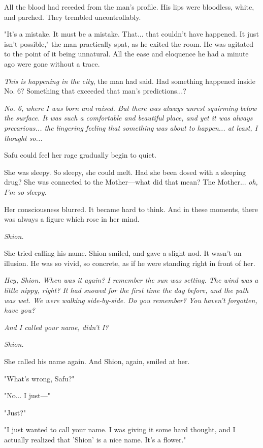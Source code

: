 All the blood had receded from the man's profile. His lips were
bloodless, white, and parched. They trembled uncontrollably.

"It's a mistake. It must be a mistake. That... that couldn't have
happened. It just isn't possible," the man practically spat, as he
exited the room. He was agitated to the point of it being unnatural. All
the ease and eloquence he had a minute ago were gone without a trace.

\emph{This is happening in the city}, the man had said. Had something happened
inside No. 6? Something that exceeded that man's predictions...?

\emph{No. 6, where I was born and raised. But there was always unrest
squirming below the surface. It was such a comfortable and beautiful
place, and yet it was always precarious... the lingering feeling that
something was about to happen... at least, I thought so...}

Safu could feel her rage gradually begin to quiet.

She was sleepy. So sleepy, she could melt. Had she been dosed with a
sleeping drug? She was connected to the Mother---what did that mean? The
Mother... \emph{oh, I'm so sleepy.}

Her consciousness blurred. It became hard to think. And in these
moments, there was always a figure which rose in her mind.

\emph{Shion.}

She tried calling his name. Shion smiled, and gave a slight nod. It
wasn't an illusion. He was so vivid, so concrete, as if he were standing
right in front of her.

\emph{Hey, Shion. When was it again? I remember the sun was setting. The wind
was a little nippy, right? It had snowed for the first time the day
before, and the path was wet. We were walking side-by-side. Do you
remember? You haven't forgotten, have you?}

\emph{And I called your name, didn't I?}

\emph{Shion.}

\myspace

She called his name again. And Shion, again, smiled at her.

"What's wrong, Safu?"

"No... I just---"

"Just?"

"I just wanted to call your name. I was giving it some hard thought, and
I actually realized that 'Shion' is a nice name. It's a flower."

